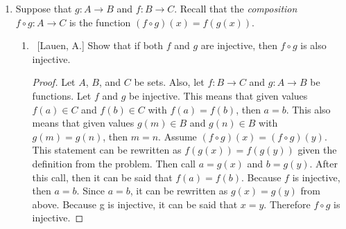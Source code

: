 \documentclass[10pt]{article}
\begin{document}
\begin{enumerate}
	\begin{enumerate}
	
	\item  Prove that a strictly increasing function from $\mathbb{R}$ to $\mathbb{R}$ is injective.  Hint: note that the definition of an injective function deals with numbers being equal.  In this problem we don't anything that would help us show that numbers are equal, since we're only given inequalities.  As a result, use the contrapositive of the definition of an injective function.  Be careful, I'm not suggesting a proof by contrapositive, only that you use the contrapositive of the definition.
 \begin{proof}
     If $x \neq y$, then either $x < y$ or $y < x$.  In the first case, we have $f(x) < f(y)$, and in the second case, we have $f(y) < f(x)$.  In both cases, we have $f(x) \neq f(y)$, and by definition, it means that $f$ is injective.
 \end{proof}
	
	\item  Give an example of an increasing function from $\mathbb{R}$ to $\mathbb{R}$ that is not injective.
 \par \medskip
	\textbf{\textcolor{black}{\underline{Answer}:}}
{\textcolor{black}{One example of an increasing function from $\mathbb{R}$ to $\mathbb{R}$ that is not injective is one that's graph continues on indefinitely up and to the right and down and to the left.  After experimenting, one way to show this algebraically is the function $x^3-x$.  The reason this function works is that every horizontal line meets the graph somewhere.  It is not injective since some horizontal lines meet the graph at more than one point.}}
	\end{enumerate}
	
\item  Suppose that $g: A \to B$ and $f:B \to C$.  Recall that the \emph{composition} $f \circ g: A \to C$ is the function $(f \circ g)(x) = f(g(x))$.

	\begin{enumerate}
	
		\item  {~[Lauen, A.] Show that if both $f$ and $g$ are injective, then $f \circ g$ is also injective.}
\begin{proof}
Let $A$, $B$, and $C$ be sets.  Also, let $f: B \xrightarrow{} C$ and $g:  A\xrightarrow{} B$ be functions.  Let $f$ and $g$ be injective.  This means that given values $f(a) \in C$ and $f(b) \in C$ with $f(a)=f(b)$, then $a = b$.  This also means that given values $g(m) \in B$ and $g(n) \in B$ with $g(m)=g(n)$, then $m = n$.  Assume $(f \circ g)(x) = (f \circ g)(y)$.  This statement can be rewritten as $f(g(x)) = f(g(y))$ given the definition from the problem.  Then call $a = g(x)$ and $b = g(y)$.  After this call, then it can be said that $f(a) = f(b)$.  Because $f$ is injective, then $a=b$.  Since $a = b$, it can be rewritten as $g(x) = g(y)$ from above.  Because g is injective, it can be said that $x=y$.  Therefore $f \circ g$ is injective.


\end{proof}
\end{enumerate}
\end{enumerate}
\end{document}
